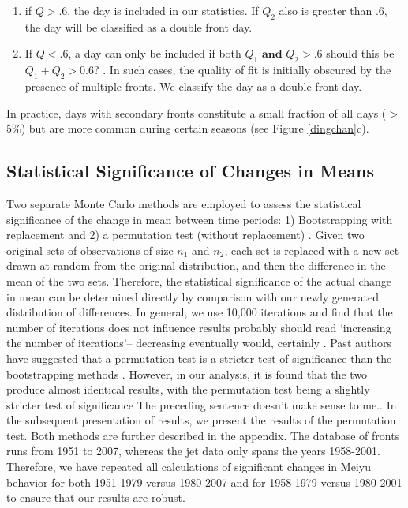 \documentclass[draft,grl]{AGUTeX}
\begin{document}
\begin{article}
\begin{enumerate}
	\item if $Q>.6$, the day is included in our statistics. If $Q_2$ also is greater than .6, the day will be classified as a double front day.
		
	\item If $Q<.6$, a day can only be included if both $Q_1 \mathrm{\textbf{ and }} Q_2 > .6$ {\color{red} should this be $Q_1 +Q_2 > 0.6$? }. In such cases, the quality of fit is initially obscured by the presence of multiple fronts. We classify the day as a double front day.
\end{enumerate}	
		
	In practice, days with secondary fronts constitute a small fraction of all days ($>$ 5\%) but are more common during certain seasons (see Figure \ref{dingchan}c).

\subsection{Statistical Significance of Changes in Means}

	Two separate Monte Carlo methods are employed to assess the statistical significance of the change in mean between time periods: 1) Bootstrapping with replacement and 2) a permutation test (without replacement) \citep{Good2005}. Given two original sets of observations of size $n_1$ and $n_2$, each set is replaced with a new set drawn at random from the original distribution, and then the difference in the mean of the two sets. Therefore, the statistical significance of the actual change in mean can be determined directly by comparison with our newly generated distribution of differences. In general, we use 10,000 iterations and find that the number of iterations does not influence results {\color{red} probably should read `increasing the number of iterations'-- decreasing eventually would, certainly }  . Past authors have suggested that a permutation test is a stricter test of significance than the bootstrapping methods \citep{Hesterberg2003}. However, in our analysis, it is found that the two produce almost identical results, with the permutation test being a slightly stricter test of significance {\color{red} The preceding sentence doesn't make sense to me.}. In the subsequent presentation of results, we present the results of the permutation test. Both methods are further described in the appendix. The database of fronts runs from 1951 to 2007, whereas the jet data only spans the years 1958-2001. Therefore, we have repeated all calculations of significant changes in Meiyu behavior for both 1951-1979 versus 1980-2007 and for 1958-1979 versus 1980-2001 to ensure that our results are robust.


\end{article}
\end{document}
